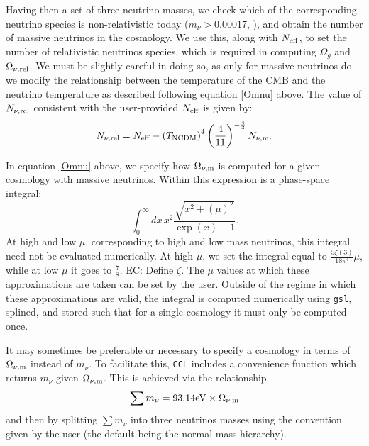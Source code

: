\documentclass[\docopts]{\docclass}
\newcommand{\elisa}[1]{\textcolor{green!10!orange!90!}{EC: #1}}
\newcommand{\ccl}{{\tt CCL}\xspace}
\begin{document}
Having then a set of three neutrino masses, we check which of the corresponding neutrino species is non-relativistic today ($m_\nu>0.00017$, \citealt{Lesgourgues2012}), and obtain the number of massive neutrinos in the cosmology. We use this, along with $N_{\rm eff}$, to set the number of relativistic neutrinos species, which is required in computing $\Omega_g$ and $\Omega_{\nu, {\rm rel}}$. We must be slightly careful in doing so, as only for massive neutrinos do we modify the relationship between the temperature of the CMB and the neutrino temperature as described following equation \ref{Omnu} above. The value of $N_{\nu, {\rm rel}}$ consistent with the user-provided $N_{\rm eff}$ is given by:
\begin{equation}
N_{\nu, {\rm rel}} = N_{\rm eff} - \left(T_{\rm NCDM}\right)^{4} \left(\frac{4}{11}\right)^{-\frac{4}{3}} N_{\nu, {\rm m}}.
\label{Nnurel}
\end{equation}

In equation \ref{Omnu} above, we specify how $\Omega_{\nu, {\rm m}}$ is computed for a given cosmology with massive neutrinos. Within this expression is a phase-space integral:
\begin{equation}
\int_0^{\infty} dx \, x^2 \frac{\sqrt{x^2 + \left(\mu\right)^2}}{\exp(x) + 1}.
\label{phasespacenu}
\end{equation}
At high and low $\mu$, corresponding to high and low mass neutrinos, this integral need not be evaluated numerically. At high $\mu$, we set the integral equal to $\frac{5\zeta(3)}{18\pi^4}\mu$, while at low $\mu$ it goes to $\frac{7}{8}$. \elisa{Define $\zeta$.} The $\mu$ values at which these approximations are taken can be set by the user. Outside of the regime in which these approximations are valid, the integral is computed numerically using {\tt gsl}, splined, and stored such that for a single cosmology it must only be computed once.

It may sometimes be preferable or necessary to specify a cosmology in terms of $\Omega_{\nu, {\rm m}}$ instead of $m_\nu$. To facilitate this, \ccl includes a convenience function which returns $m_\nu$ given $\Omega_{\nu, {\rm m}}$. This is achieved via the relationship
\begin{equation}
\sum m_\nu = 93.14 {\rm eV} \times \Omega_{\nu, {\rm m}}
\label{summnu_om}
\end{equation}
and then by splitting $\sum m_\nu$ into three neutrinos masses using the convention given by the user (the default being the normal mass hierarchy).
\end{document}
